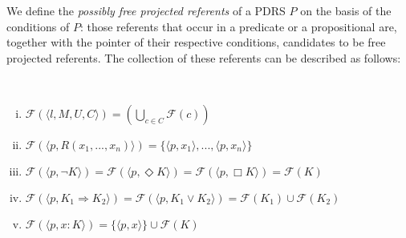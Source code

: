 We define the \textit{possibly free projected referents} of a PDRS $P$ on the
basis of the conditions of $P$: those referents that occur in a predicate or
a propositional are, together with the pointer of their respective
conditions, candidates to be free projected referents. The collection of
these referents can be described as follows:

\begin{subdefinition}~
  \begin{enumerate}[i.]
    \item $\mathcal{F}(\langle l, M, U, C \rangle)
      = (\bigcup_{c\in C} \mathcal{F}(c))$
    \item $\mathcal{F}(\langle p, R(x_1,...,x_n)\rangle)
      = \{\langle p, x_1\rangle, ..., \langle p, x_n\rangle\}$
    \item $\mathcal{F}(\langle p,\neg K\rangle) 
      = \mathcal{F}(\langle p,\Diamond K\rangle) 
      = \mathcal{F}(\langle p,\Box K\rangle)
      = \mathcal{F}(K)$
    \item $\mathcal{F}(\langle p,K_1 \Rightarrow K_2\rangle)
      = \mathcal{F}(\langle p,K_1 \vee K_2\rangle)
      = \mathcal{F}(K_1) \cup \mathcal{F}(K_2)$
    \item $\mathcal{F}(\langle p,x:K\rangle)
      = \{\langle p,x \rangle\} \cup \mathcal{F}(K)$
  \end{enumerate}
\end{subdefinition}

